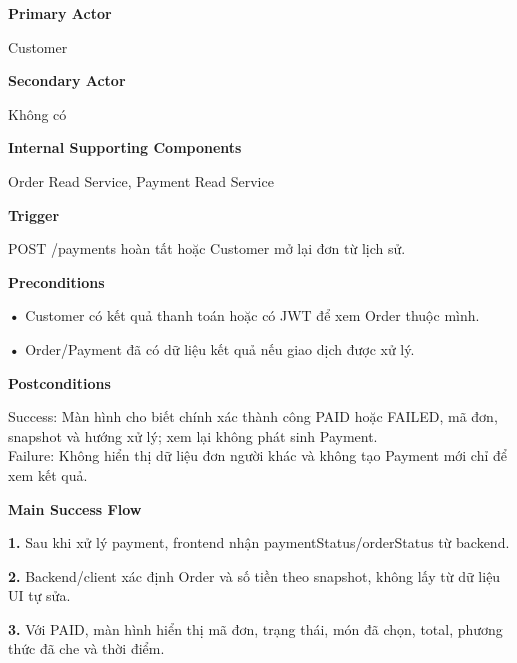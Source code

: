 \documentclass[11pt,a4paper,oneside]{report}
\begin{document}
\par\smallskip\noindent\textcolor{sgublue}{\textbf{Primary Actor}}\par\nobreak
Customer
\par

\par\smallskip\noindent\textcolor{sgublue}{\textbf{Secondary Actor}}\par\nobreak
Không có
\par

\par\smallskip\noindent\textcolor{sgublue}{\textbf{Internal Supporting Components}}\par\nobreak
Order Read Service, Payment Read Service
\par

\par\smallskip\noindent\textcolor{sgublue}{\textbf{Trigger}}\par\nobreak
POST /payments hoàn tất hoặc Customer mở lại đơn từ lịch sử.
\par

\par\smallskip\noindent\textcolor{sgublue}{\textbf{Preconditions}}\par\nobreak
\textbf{•} Customer có kết quả thanh toán hoặc có JWT để xem Order thuộc mình.

\textbf{•} Order/Payment đã có dữ liệu kết quả nếu giao dịch được xử lý.
\par

\par\smallskip\noindent\textcolor{sgublue}{\textbf{Postconditions}}\par\nobreak
Success: Màn hình cho biết chính xác thành công PAID hoặc FAILED, mã đơn, snapshot và hướng xử lý; xem lại không phát sinh Payment.\\
Failure: Không hiển thị dữ liệu đơn người khác và không tạo Payment mới chỉ để xem kết quả.\strut
\par

\par\smallskip\noindent\textcolor{sgublue}{\textbf{Main Success Flow}}\par\nobreak
\textbf{1.} Sau khi xử lý payment, frontend nhận paymentStatus/orderStatus từ backend.

\textbf{2.} Backend/client xác định Order và số tiền theo snapshot, không lấy từ dữ liệu UI tự sửa.

\textbf{3.} Với PAID, màn hình hiển thị mã đơn, trạng thái, món đã chọn, total, phương thức đã che và thời điểm.
\end{document}
